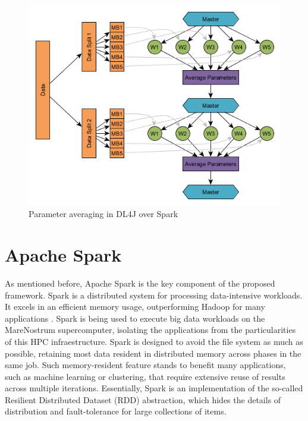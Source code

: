 \documentclass[journal]{IEEEtran}
\begin{document}
\begin{figure}
\begin{center}
\centerline{\includegraphics[width=1.0\linewidth]{img/parameter_averaging.png}}
\caption{Parameter averaging in DL4J over Spark}
\label{fig:speedup1}
\end{center}
\vspace{-0.5cm}
\end{figure}


\section{Apache Spark}
\label{sec:spark}

As mentioned before, Apache Spark is the key component of the proposed framework. Spark is a distributed system for processing data-intensive workloads. It excels in an efficient memory usage, outperforming Hadoop for many applications \cite{zaharia2012}. Spark is being used to execute big data workloads on the MareNostrum supercomputer, isolating the applications from the particularities of this HPC infraestructure. Spark is designed to avoid the file system as much as possible, retaining most data resident in distributed memory across phases in the same job. Such memory-resident feature stands to benefit many applications, such as machine learning or clustering, that require extensive reuse of results across multiple iterations.
Essentially, Spark is an implementation of the so-called Resilient Distributed Dataset (RDD) abstraction, which hides the details of distribution and fault-tolerance for large collections of items.
\end{document}
